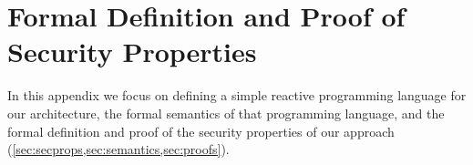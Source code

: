
\section{Formal Definition and Proof of Security Properties}

In this appendix we focus on defining a simple reactive
programming language for our architecture, the formal semantics of that
programming language, and the formal definition and proof of the security
properties of our approach
(\cref{sec:secprops,sec:semantics,sec:proofs}).





